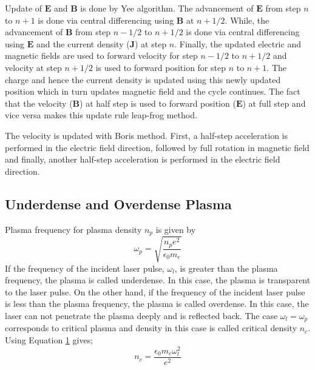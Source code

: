 \documentclass[12pt]{article}
\newenvironment{changemargin}[2]{%
\begin{list}{}{%
\setlength{\topsep}{0pt}%
\setlength{\leftmargin}{#1}%
\setlength{\rightmargin}{#2}%
\setlength{\listparindent}{\parindent}%
\setlength{\itemindent}{\parindent}%
\setlength{\parsep}{\parskip}%
}%
\item[]}{\end{list}}
\begin{document}
\begin{changemargin}{-3cm}{-3cm}
    Update of $\mathbf{E}$ and $\mathbf{B}$ is done by Yee algorithm. The advancement of $\mathbf{E}$ from step $n$ to $n+1$ is done via central differencing using $\mathbf{B}$ at $n+1/2$. While, the advancement of $\mathbf{B}$ from step $n-1/2$ to $n+1/2$ is done via central differencing using $\mathbf{E}$ and the current density ($\textbf{J}$) at step $n$. Finally, the updated electric and magnetic fields are used to forward velocity for step $n-1/2$ to $n+1/2$ and velocity at step $n+1/2$ is used to forward position for step $n$ to $n+1$. The charge and hence the current density is updated using this newly updated position which in turn updates magnetic field and the cycle continues. The fact that the velocity ($\mathbf{B}$) at half step is used to forward position ($\mathbf{E}$) at full step and vice versa makes this update rule leap-frog method.

    The velocity is updated with Boris method. First, a half-step acceleration is performed in the electric field direction, followed by full rotation in magnetic field and finally, another half-step acceleration is performed in the electric field direction.
    \subsection{Underdense and Overdense Plasma}
    Plasma frequency for plasma density $n_p$ is given by\cite{chen}
    \begin{equation}\label{plasma-frequency}
        \omega_p = \sqrt{\frac{n_p e^2}{\epsilon_0 m_e}}
    \end{equation}
    If the frequency of the incident laser pulse, $\omega_l$, is greater than the plasma frequency, the plasma is called underdense. In this case, the plasma is transparent to the laser pulse. On the other hand, if the frequency of the incident laser pulse is less than the plasma frequency, the plasma is called overdense. In this case, the laser can not penetrate the plasma deeply and is reflected back. The case $\omega_l = \omega_p$ corresponds to critical plasma and density in this case is called critical density $n_c$. Using Equation \hyperref[plasma-frequency]{1} gives;
    \begin{equation}\label{critical-density}
        n_c = \frac{\epsilon_0 m_e \omega_l^2}{e^2}
    \end{equation}

\end{changemargin}
\end{document}
